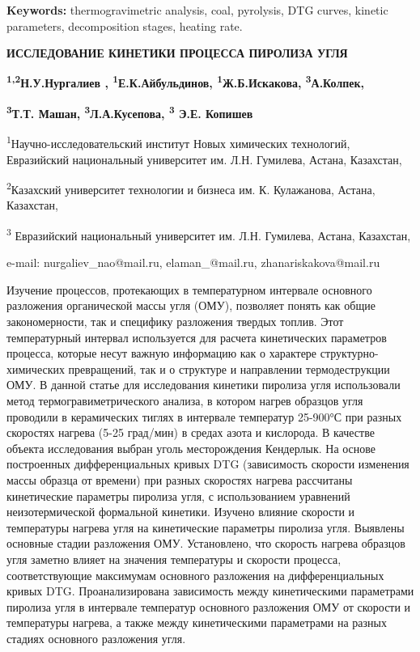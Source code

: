 {\bfseries Keywords:} thermogravimetric analysis, coal, pyrolysis, DTG
curves, kinetic parameters, decomposition stages, heating rate.

{\bfseries ИССЛЕДОВАНИЕ КИНЕТИКИ ПРОЦЕССА ПИРОЛИЗА УГЛЯ}

{\bfseries \textsuperscript{1,2}Н.У.Нургалиев ,
\textsuperscript{1}Е.К.Айбульдинов, \textsuperscript{1}Ж.Б.Искакова,
\textsuperscript{3}А.Колпек,}

{\bfseries \textsuperscript{3}Т.Т. Машан, \textsuperscript{3}Л.А.Кусепова,
\textsuperscript{3} Э.Е. Копишев}

\textsuperscript{1}Научно-исследовательский институт Новых химических
технологий, Евразийский национальный университет им. Л.Н. Гумилева,
Астана, Казахстан,

\textsuperscript{2}Казахский университет технологии и бизнеса им. К.
Кулажанова, Астана, Казахстан,

\textsuperscript{3} Евразийский национальный университет им. Л.Н.
Гумилева, Астана, Казахстан,

e-mail: nurgaliev\_nao@mail.ru, elaman\_@mail.ru, zhanariskakova@mail.ru

Изучение процессов, протекающих в температурном интервале основного
разложения органической массы угля (ОМУ), позволяет понять как общие
закономерности, так и специфику разложения твердых топлив. Этот
температурный интервал используется для расчета кинетических параметров
процесса, которые несут важную информацию как о характере
структурно-химических превращений, так и о структуре и направлении
термодеструкции ОМУ. В данной статье для исследования кинетики пиролиза
угля использовали метод термогравиметрического анализа, в котором нагрев
образцов угля проводили в керамических тиглях в интервале температур
25-900°С при разных скоростях нагрева (5-25 град/мин) в средах азота и
кислорода. В качестве объекта исследования выбран уголь месторождения
Кендерлык. На основе построенных дифференциальных кривых DTG
(зависимость скорости изменения массы образца от времени) при разных
скоростях нагрева рассчитаны кинетические параметры пиролиза угля, с
использованием уравнений неизотермической формальной кинетики. Изучено
влияние скорости и температуры нагрева угля на кинетические параметры
пиролиза угля. Выявлены основные стадии разложения ОМУ. Установлено, что
скорость нагрева образцов угля заметно влияет на значения температуры и
скорости процесса, соответствующие максимумам основного разложения на
дифференциальных кривых DTG. Проанализирована зависимость между
кинетическими параметрами пиролиза угля в интервале температур основного
разложения ОМУ от скорости и температуры нагрева, а также между
кинетическими параметрами на разных стадиях основного разложения угля.

